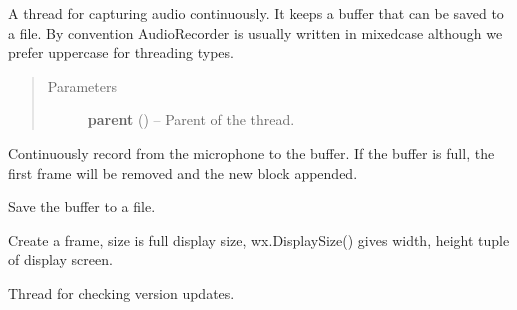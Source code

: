 \documentclass[letterpaper,10pt,english]{sphinxmanual}
\begin{document}

\begin{fulllineitems}
\label{wos:wos.AudioRecorder}
A thread for capturing audio continuously.
It keeps a buffer that can be saved to a file.
By convention AudioRecorder is usually written in mixedcase although we
prefer uppercase for threading types.
\begin{quote}\begin{description}
\item[{Parameters}] \leavevmode
\textbf{parent} () -- Parent of the thread.

\end{description}\end{quote}

\begin{fulllineitems}
\label{wos:wos.AudioRecorder.run}
Continuously record from the microphone to the buffer.
If the buffer is full, the first frame will be removed and
the new block appended.

\end{fulllineitems}


\begin{fulllineitems}
\label{wos:wos.AudioRecorder.save}
Save the buffer to a file.

\end{fulllineitems}


\end{fulllineitems}


\begin{fulllineitems}
\label{wos:wos.BlackOverlay}
Create a frame, size is full display size, wx.DisplaySize()
gives width, height tuple of display screen.

\end{fulllineitems}


\begin{fulllineitems}
\label{wos:wos.CHECK_UPDATE}
Thread for checking version updates.

\end{fulllineitems}
\end{document}
